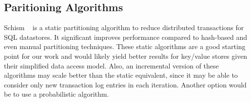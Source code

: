 \subsection{Paritioning Algorithms}
Schism ~\cite{Curino:2010:SWA:1920841.1920853} is a static partitioning algorithm to reduce distributed transactions for SQL datastores. It significant improves performance compared to hash-based and even manual partitioning techniques. These static algorithms are a good starting point for our work and would likely yield better results for key/value stores given their simplified data access model. Also, an incremental version of these algorithms may scale better than the static equivalent, since it may be able to consider only new transaction log entries in each iteration. Another option would be to use a probabilistic algorithm.

